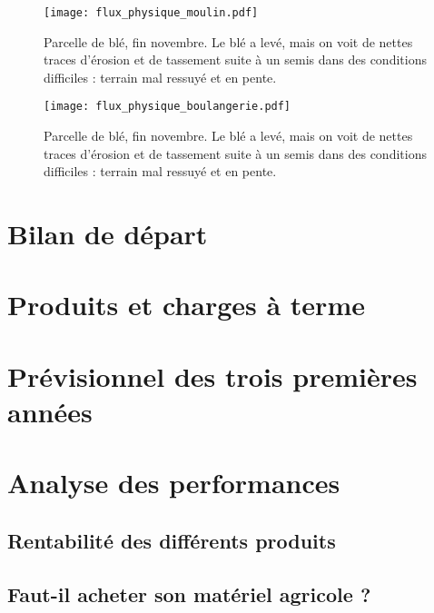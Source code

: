 \documentclass{book}
\begin{document}
\begin{figure}[h!]
\begin{center}
	\texttt{[image: flux\_physique\_moulin.pdf]}
	\caption{Parcelle de blé, fin novembre. Le blé a levé, mais on voit de nettes traces d'érosion et de tassement suite à un semis dans des conditions difficiles : terrain mal ressuyé et en pente.}
	\label{fig:rot_cercle}
\end{center}
\end{figure}

\begin{figure}[h!]
\begin{center}
	\texttt{[image: flux\_physique\_boulangerie.pdf]}
	\caption{Parcelle de blé, fin novembre. Le blé a levé, mais on voit de nettes traces d'érosion et de tassement suite à un semis dans des conditions difficiles : terrain mal ressuyé et en pente.}
	\label{fig:rot_cercle}
\end{center}
\end{figure}


\section{Bilan de départ}

\section{Produits et charges à terme}

\section{Prévisionnel des trois premières années}

\section{Analyse des performances}

\subsection{Rentabilité des différents produits}

\subsection{Faut-il acheter son matériel agricole ?}
\end{document}
